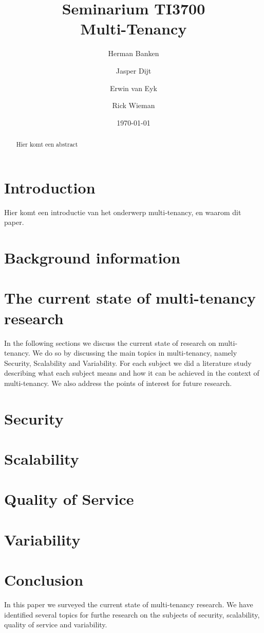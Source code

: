 \documentclass{article}
\title{Seminarium TI3700\\ Multi-Tenancy}
\author{Herman Banken\and
    Jasper Dijt\and
    Erwin van Eyk\and
    Rick Wieman}
\date{\today}
\begin{document}
\maketitle
\thispagestyle{empty}

\begin{abstract}
Hier komt een abstract
\end{abstract}


\section{Introduction}
Hier komt een introductie van het onderwerp multi-tenancy, en waarom dit paper.

\section{Background information}


\section{The current state of multi-tenancy research}
In the following sections we discuss the current state of research on multi-tenancy. We do so by discussing the main topics in multi-tenancy, namely Security, Scalability and Variability. For each subject we did a literature study describing what each subject means and how it can be achieved in the context of multi-tenancy. We also address the points of interest for future research.

\section{Security}


\section{Scalability}


\section{Quality of Service}


\section{Variability}



\section{Conclusion}
In this paper we surveyed the current state of multi-tenancy research.
We have identified several topics for furthe research on the subjects of security, scalability, quality of service and variability.




\end{document}
